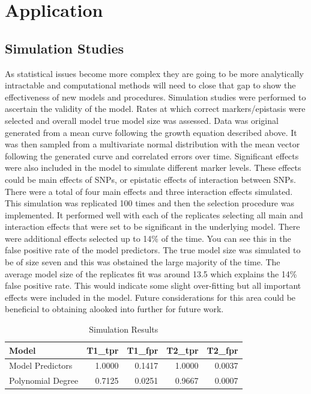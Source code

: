\documentclass[11pt,]{book}
\theoremstyle{definition}
\theoremstyle{definition}
\theoremstyle{remark}
\begin{document}
\section{Application}\label{application-2}

\subsection{Simulation Studies}\label{simulation-studies-1}

As statistical issues become more complex they are going to be more
analytically intractable and computational methods will need to close
that gap to show the effectiveness of new models and procedures.
Simulation studies were performed to ascertain the validity of the
model. Rates at which correct markers/epistasis were selected and
overall model true model size was assessed. Data was original generated
from a mean curve following the growth equation described above. It was
then sampled from a multivariate normal distribution with the mean
vector following the generated curve and correlated errors over time.
Significant effects were also included in the model to simulate
different marker levels. These effects could be main effects of SNPs, or
epistatic effects of interaction between SNPs. There were a total of
four main effects and three interaction effects simulated. This
simulation was replicated 100 times and then the selection procedure was
implemented. It performed well with each of the replicates selecting all
main and interaction effects that were set to be significant in the
underlying model. There were additional effects selected up to 14\% of
the time. You can see this in the false positive rate of the model
predictors. The true model size was simulated to be of size seven and
this was obstained the large majority of the time. The average model
size of the replicates fit was around 13.5 which explains the 14\% false
positive rate. This would indicate some slight over-fitting but all
important effects were included in the model. Future considerations for
this area could be beneficial to obtaining alooked into further for
future work.

\begin{table}

\caption{\label{tab:Chap4SimResults}Simulation Results}
\centering
\begin{tabular}[t]{l|r|r|r|r}
\hline
Model & T1\_tpr & T1\_fpr & T2\_tpr & T2\_fpr\\
\hline
Model Predictors & 1.0000 & 0.1417 & 1.0000 & 0.0037\\
\hline
Polynomial Degree & 0.7125 & 0.0251 & 0.9667 & 0.0007\\
\hline
\end{tabular}
\end{table}
\end{document}
